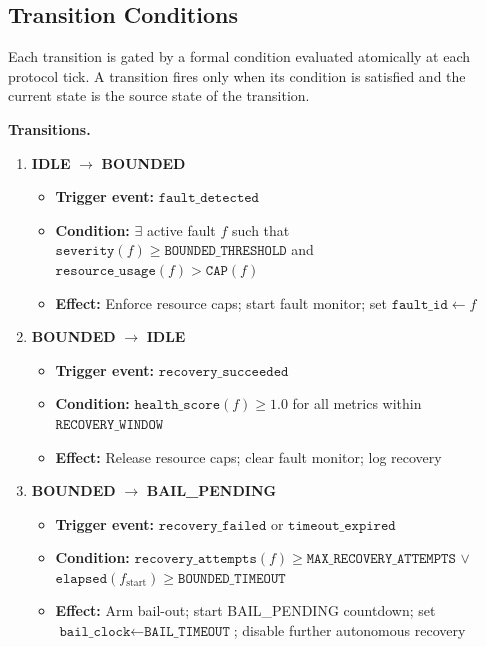 \subsection{Transition Conditions}

Each transition is gated by a formal condition evaluated atomically at each protocol tick. A transition fires only when its condition is satisfied and the current state is the source state of the transition.

\bigskip

\noindent\textbf{Transitions.}

\begin{enumerate}
  \item \textbf{IDLE} $\rightarrow$ \textbf{BOUNDED}
  \begin{itemize}
    \item \textbf{Trigger event:} $\texttt{fault\_detected}$
    \item \textbf{Condition:} $\exists$ active fault $f$ such that $\texttt{severity}(f) \geq \texttt{BOUNDED\_THRESHOLD}$ and $\texttt{resource\_usage}(f) > \texttt{CAP}(f)$
    \item \textbf{Effect:} Enforce resource caps; start fault monitor; set $\texttt{fault\_id} \leftarrow f$
  \end{itemize}

  \item \textbf{BOUNDED} $\rightarrow$ \textbf{IDLE}
  \begin{itemize}
    \item \textbf{Trigger event:} $\texttt{recovery\_succeeded}$
    \item \textbf{Condition:} $\texttt{health\_score}(f) \geq 1.0$ for all metrics within $\texttt{RECOVERY\_WINDOW}$
    \item \textbf{Effect:} Release resource caps; clear fault monitor; log recovery
  \end{itemize}

  \item \textbf{BOUNDED} $\rightarrow$ \textbf{BAIL\_PENDING}
  \begin{itemize}
    \item \textbf{Trigger event:} $\texttt{recovery\_failed}$ or $\texttt{timeout\_expired}$
    \item \textbf{Condition:} $\texttt{recovery\_attempts}(f) \geq \texttt{MAX\_RECOVERY\_ATTEMPTS}$ $\lor$ $\texttt{elapsed}(f_{\text{start}}) \geq \texttt{BOUNDED\_TIMEOUT}$
    \item \textbf{Effect:} Arm bail-out; start BAIL\_PENDING countdown; set $\texttt{bail\_clock} \leftarrow \texttt{BAIL\_TIMEOUT}$; disable further autonomous recovery
  \end{itemize}


\end{enumerate}
